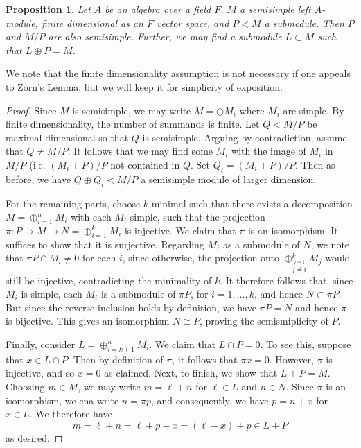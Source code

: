 \documentclass[12pt]{report}
\theoremstyle{plain}
\newtheorem{prop}[thm]{Proposition}
\begin{document}
\begin{prop} \label{semisimple sub quot}
Let $A$ be an algebra over a field $F$, $M$ a semisimple left $A$-module,
finite dimensional as an $F$ vector space, and $P < M$ a submodule. Then
$P$ and $M/P$ are also semisimple. Further, we may find a submodule $L
\subset M$ such that $L \oplus P = M$.
\end{prop}
We note that the finite dimensionality assumption is not necessary if one
appeals to Zorn's Lemma, but we will keep it for simplicity of exposition.
\begin{proof}
Since $M$ is semisimple, we may write $M = \oplus M_i$ where $M_i$ are
simple. By finite dimensionality, the number of summands is finite.  Let $Q
< M/P$ be maximal dimensional so that $Q$ is semisimple. Arguing by
contradiction, assume that $Q \neq M/P$. It follows that we may find some
$M_i$ with the image of $M_i$ in $M/P$ (i.e.  $(M_i + P)/P$ not contained
in $Q$. Set $Q_i = (M_i + P)/P$. Then as before, we have $Q \oplus Q_i <
M/P$ a semisimple module of larger dimension.

For the remaining parts, choose $k$ minimal such that there exists a
decomposition $M = \oplus_{i = 1}^n M_i$ with each $M_i$ simple, such that the
projection $\pi: P \to M \to N = \oplus_{i = 1}^k M_i$ is injective. We claim
that $\pi$ is an isomorphism. It suffices to show that it is surjective.
Regarding $M_i$ as a submodule of $N$, we note that $\pi P \cap M_i \neq 0$
for each $i$, since otherwise, the projection onto $\oplus_{\stackrel{j =
1}{j \neq i}}^k M_j$ would still be injective, contradicting the minimality
of $k$. It therefore follows that, since $M_i$ is simple, each $M_i$ is a
submodule of $\pi P$, for $i = 1, \ldots, k$, and hence $N \subset \pi P$.
But since the reverse inclusion holds by definition, we have $\pi P = N$
and hence $\pi$ is bijective. This gives an isomorphism $N \cong P$,
proving the semismiplicity of $P$.

Finally, consider $L = \oplus_{i = k+1}^n M_i$. We claim that $L \cap P =
0$. To see this, suppose that $x \in L \cap P$. Then by
definition of $\pi$, it follows that $\pi x = 0$. However, $\pi$ is
injective, and so $x = 0$ as claimed. Next, to finish, we show that $L
+ P = M$. Choosing $m \in M$, we may write $m = \ell + n$ for $\ell \in L$
and $n \in N$. Since $\pi$ is an isomorphism, we cna write $n = \pi p$, and
consequently, we have $p = n + x$ for $x \in L$. We therefore have
\[m = \ell + n = \ell + p - x = (\ell - x) + p \in L + P\]
as desired.
\end{proof}
\end{document}
